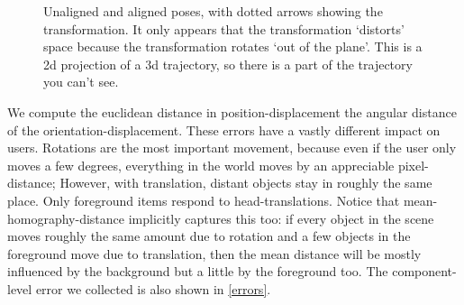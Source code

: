 \begin{figure}
  \label{transformation}
  \caption{Unaligned and aligned poses, with dotted arrows showing the transformation. It only appears that the transformation `distorts' space because the transformation rotates `out of the plane'. This is a 2d projection of a 3d trajectory, so there is a part of the trajectory you can't see.}
\end{figure}

We compute the euclidean distance in position-displacement the angular distance of the orientation-displacement.
These errors have a vastly different impact on users.
Rotations are the most important movement, because even if the user only moves a few degrees, everything in the world moves by an appreciable pixel-distance;
However, with translation, distant objects stay in roughly the same place. Only foreground items respond to head-translations.
Notice that mean-homography-distance implicitly captures this too:
if every object in the scene moves roughly the same amount due to rotation and a few objects in the foreground move due to translation, then the mean distance will be mostly influenced by the background but a little by the foreground too.
The component-level error we collected is also shown in \cref{errors}.
